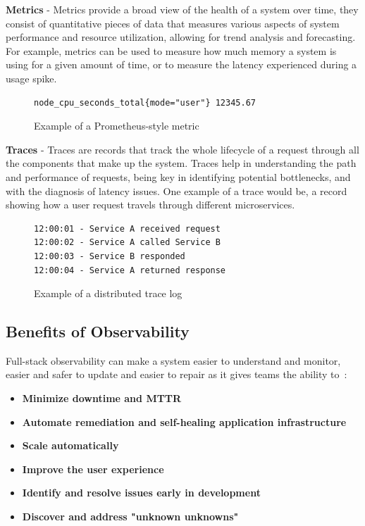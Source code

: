 \textbf{Metrics} - Metrics provide a broad view of the health of a system over time, they consist of quantitative
pieces
of data that
measures various aspects of system performance and resource utilization, allowing for trend analysis and forecasting.
For example, metrics can be used to measure how much memory a system is using for a given amount of time, or to
measure the latency experienced during a usage spike.\\
\begin{figure}[h]
    \centering
    \begin{lstlisting}
node_cpu_seconds_total{mode="user"} 12345.67
    \end{lstlisting}
    \caption{Example of a Prometheus-style metric}
\end{figure}


\textbf{Traces} - Traces are records that track the whole lifecycle of a request through all the components that
make up
the system.
Traces help in understanding the path and performance of requests, being key in identifying potential bottlenecks,
and with the diagnosis of latency issues.
One example of a trace would be, a record showing how a user request travels through different microservices.\\
\begin{figure}[h]
    \centering
    \begin{lstlisting}
12:00:01 - Service A received request
12:00:02 - Service A called Service B
12:00:03 - Service B responded
12:00:04 - Service A returned response
    \end{lstlisting}
    \caption{Example of a distributed trace log}
\end{figure}


\subsection{Benefits of Observability}\label{subsec:benefits-of-observability}

Full-stack observability can make a system easier to understand and monitor, easier and safer to update and easier 
to repair as it gives teams the ability to~\cite{ibm_observability}:

\begin{itemize}
    \item   \textbf{Minimize downtime and \ac{MTTR}}
    \item   \textbf{Automate remediation and self-healing application infrastructure}
    \item   \textbf{Scale automatically}
    \item   \textbf{Improve the user experience}
    \item   \textbf{Identify and resolve issues early in development}
    \item   \textbf{Discover and address "unknown unknowns"}
\end{itemize}
